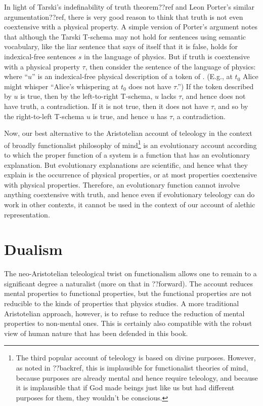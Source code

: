 In light of Tarski's indefinability of truth theorem??ref and Leon Porter's similar argumentation??ref, there is very good 
reason to think that truth is not even coextensive with a physical property. A simple version of Porter's argument notes that although the Tarski T-schema 
may not hold for sentences using semantic vocabulary, like the liar sentence that says of itself that it is false,
 holds for indexical-free sentences $s$ in the language of physics.
But if truth is coextensive with a physical property $\tau$, then consider the sentence of the language of physics:
where ``$u$'' is an indexical-free physical description of a token of . (E.g., at $t_0$ Alice might whisper ``Alice's whispering 
at $t_0$ does not have $\tau$.'') If the token described by $u$ is true, then by the left-to-right T-schema, $u$ lacks $\tau$, and hence
does not have truth, a contradiction. If it is not true, then it does not have $\tau$, and so by the right-to-left T-schema $u$ is true, and hence $u$ has $\tau$, a contradiction. 

Now, our best alternative to the Aristotelian account of teleology in the context of broadly functionalist philosophy of mind\footnote{The third popular account of teleology is based on divine purposes. However, as noted in ??backref, this
is implausible for functionalist theories of mind, because purposes are already mental and hence require teleology,
and because it is implausible that if God made beings just like us but had different purposes for them, they wouldn't be conscious.} is an evolutionary account according to which the 
proper function of a system is a function that has an evolutionary explanation. But evolutionary explanations are 
scientific, and hence what they explain is the occurrence of physical properties, or at most properties coextensive 
with physical properties. Therefore, an evolutionary function cannot involve anything coextensive with truth, and hence 
even if evolutionary teleology can do work in other contexts, it cannot be used in the context of our account of 
alethic representation.

\section{Dualism}\label{sec:dualism}
The neo-Aristotelian teleological twist on functionalism allows one to remain to a significant degree a naturalist (more on that
in ??forward). The account reduces mental properties to functional properties, but the functional properties are not 
reducible to the kinds of properties that physics studies. A more traditional Aristotelian approach, however, is to refuse
to reduce the reduction of mental properties to non-mental ones. This is certainly also compatible with the robust view of
human nature that has been defended in this book. 

